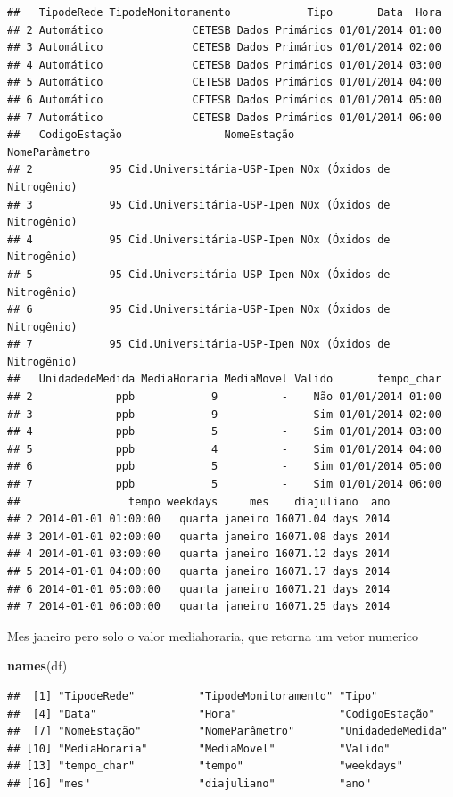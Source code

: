 \documentclass[]{book}
\newenvironment{Shaded}{\begin{snugshade}}{\end{snugshade}}
\newcommand{\KeywordTok}[1]{\textcolor[rgb]{0.13,0.29,0.53}{\textbf{#1}}}
\newcommand{\NormalTok}[1]{#1}
\theoremstyle{definition}
\theoremstyle{definition}
\theoremstyle{definition}
\theoremstyle{remark}
\begin{document}
\begin{verbatim}
##   TipodeRede TipodeMonitoramento            Tipo       Data  Hora
## 2 Automático              CETESB Dados Primários 01/01/2014 01:00
## 3 Automático              CETESB Dados Primários 01/01/2014 02:00
## 4 Automático              CETESB Dados Primários 01/01/2014 03:00
## 5 Automático              CETESB Dados Primários 01/01/2014 04:00
## 6 Automático              CETESB Dados Primários 01/01/2014 05:00
## 7 Automático              CETESB Dados Primários 01/01/2014 06:00
##   CodigoEstação                NomeEstação              NomeParâmetro
## 2            95 Cid.Universitária-USP-Ipen NOx (Óxidos de Nitrogênio)
## 3            95 Cid.Universitária-USP-Ipen NOx (Óxidos de Nitrogênio)
## 4            95 Cid.Universitária-USP-Ipen NOx (Óxidos de Nitrogênio)
## 5            95 Cid.Universitária-USP-Ipen NOx (Óxidos de Nitrogênio)
## 6            95 Cid.Universitária-USP-Ipen NOx (Óxidos de Nitrogênio)
## 7            95 Cid.Universitária-USP-Ipen NOx (Óxidos de Nitrogênio)
##   UnidadedeMedida MediaHoraria MediaMovel Valido       tempo_char
## 2             ppb            9          -    Não 01/01/2014 01:00
## 3             ppb            9          -    Sim 01/01/2014 02:00
## 4             ppb            5          -    Sim 01/01/2014 03:00
## 5             ppb            4          -    Sim 01/01/2014 04:00
## 6             ppb            5          -    Sim 01/01/2014 05:00
## 7             ppb            5          -    Sim 01/01/2014 06:00
##                 tempo weekdays     mes    diajuliano  ano
## 2 2014-01-01 01:00:00   quarta janeiro 16071.04 days 2014
## 3 2014-01-01 02:00:00   quarta janeiro 16071.08 days 2014
## 4 2014-01-01 03:00:00   quarta janeiro 16071.12 days 2014
## 5 2014-01-01 04:00:00   quarta janeiro 16071.17 days 2014
## 6 2014-01-01 05:00:00   quarta janeiro 16071.21 days 2014
## 7 2014-01-01 06:00:00   quarta janeiro 16071.25 days 2014
\end{verbatim}

Mes janeiro pero solo o valor mediahoraria, que retorna um vetor
numerico

\begin{Shaded}
\begin{Highlighting}[]
\KeywordTok{names}\NormalTok{(df)}
\end{Highlighting}
\end{Shaded}

\begin{verbatim}
##  [1] "TipodeRede"          "TipodeMonitoramento" "Tipo"               
##  [4] "Data"                "Hora"                "CodigoEstação"      
##  [7] "NomeEstação"         "NomeParâmetro"       "UnidadedeMedida"    
## [10] "MediaHoraria"        "MediaMovel"          "Valido"             
## [13] "tempo_char"          "tempo"               "weekdays"           
## [16] "mes"                 "diajuliano"          "ano"
\end{verbatim}
\end{document}
